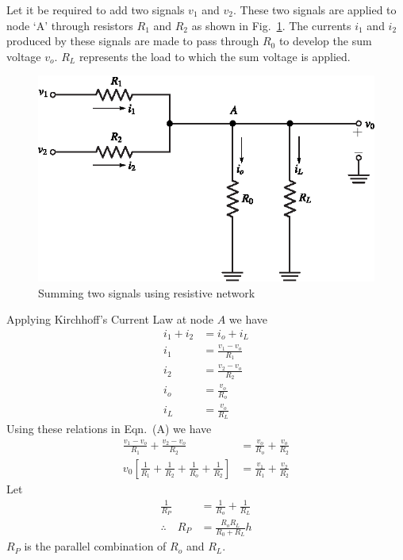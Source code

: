 \begin{solution}
Let it be required to add two signals $v_{1}$ and $v_{2}$. These two signals are applied to node `A' through resistors $R_{1}$ and $R_{2}$ as shown in Fig.~\ref{fig5.22}. The currents $i_{1}$ and $i_{2}$ produced by these signals are made to pass through $R_{0}$ to develop the sum voltage $v_{o}$. $R_{L}$ represents the load to which the sum voltage is applied.
\begin{figure}[H]
\centering
\includegraphics{chap4/sol4.27.eps}
\caption{Summing two signals using resistive network}\label{fig5.22}
\end{figure}
Applying Kirchhoff's Current Law at node $A$ we have
\begin{align*}
i_{1}+i_{2} &= i_{o}+i_{L}\tag{A}\\[7pt]
i_{1} &= \frac{v_{1}-v_{o}}{R_{1}}\\[3pt]
i_{2} &= \frac{v_{2}-v_{o}}{R_{2}}\\[3pt]
i_{o} &= \frac{v_{o}}{R_{o}}\\[3pt]
i_{L} &= \frac{v_{o}}{R_{L}}
\end{align*}
Using these relations in Eqn.~(A) we have
\begin{align*}
\frac{v_{1}-v_{o}}{R_{1}}+\frac{v_{2}-v_{o}}{R_{2}} &= \frac{v_{o}}{R_{o}}+\frac{v_{o}}{R_{2}}\\[3pt]
v_{0}\left[\frac{1}{R_{1}}+\frac{1}{R_{2}}+\frac{1}{R_{o}}+\frac{1}{R_{2}}\right] &= \frac{v_{1}}{R_{1}}+\frac{v_{2}}{R_{2}}\tag{B}
\end{align*}
Let
\begin{align*}
\frac{1}{R_{P}} &= \frac{1}{R_{o}}+\frac{1}{R_{L}}\tag{C}\\[3pt]
\therefore\quad R_{P} &= \frac{R_{o}R_{L}}{R_{0}+R_{L}}h\tag{D}
\end{align*}
$R_{P}$ is the parallel combination of $R_{o}$ and $R_{L}$.


\end{solution}
